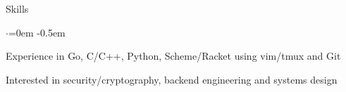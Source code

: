 \documentclass{resume} %
\begin{document}

\begin{rSection}{Skills}
  \vspace {0.5em}
  \begin{list}{$\cdot$}{\leftmargin=0em}
    \itemsep -0.5em \vspace{-0.5em}
    \item Experience in Go, C/C++, Python, Scheme/Racket using vim/tmux and Git
    \item Interested in security/cryptography, backend engineering and systems design
  \end{list}
  \vspace{0.5em}
\end{rSection}

\end{document}
